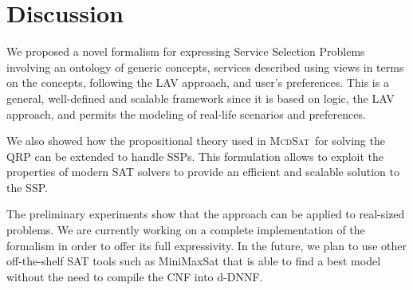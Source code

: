 \documentclass{llncs}
\newcommand{\mcdsat}{\textsc{McdSat}}
\begin{document}
\section{Discussion}

We proposed a novel formalism for expressing Service Selection Problems
involving an ontology of generic concepts, services described using views
in terms on the concepts, following the LAV approach, and user's preferences.
This is a general, well-defined and scalable framework since it is based
on logic, the LAV approach, and permits the modeling of real-life scenarios
and preferences.

We also showed how the propositional theory used in \mcdsat\ for solving
the QRP can be extended to handle SSPs.
This formulation allows to exploit the properties of modern SAT solvers
to provide an efficient and scalable solution to the SSP.

The preliminary experiments show that the approach can be applied to
real-sized problems. We are currently working on a complete implementation
of the formalism in order to offer its full expressivity.
In the future, we plan to use other off-the-shelf SAT tools such 
as MiniMaxSat that is able to find a best model without the need 
to compile the CNF into d-DNNF.



\end{document}
